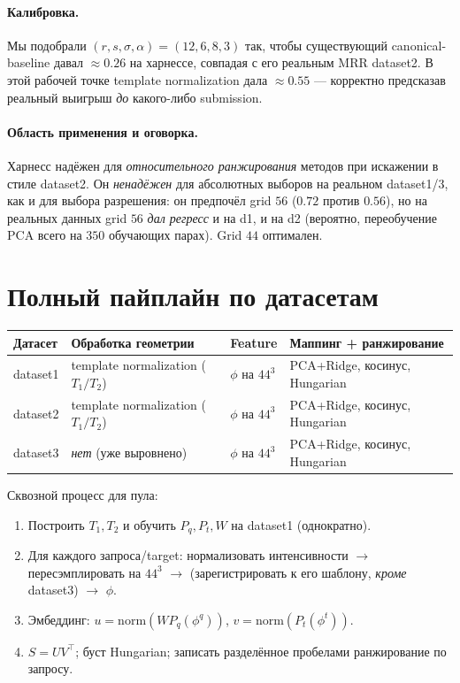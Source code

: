 \documentclass[11pt]{article}
\begin{document}
\paragraph{Калибровка.} Мы подобрали $(r,s,\sigma,\alpha)=(12,6,8,3)$ так, чтобы
существующий canonical-baseline давал $\approx0.26$ на харнессе, совпадая с его реальным
MRR dataset2. В этой рабочей точке template normalization дала $\approx0.55$
--- корректно предсказав реальный выигрыш \emph{до} какого-либо submission.

\paragraph{Область применения и оговорка.} Харнесс надёжен для \emph{относительного
ранжирования} методов при искажении в стиле dataset2. Он \emph{ненадёжен} для
абсолютных выборов на реальном dataset1/3, как и для выбора разрешения: он предпочёл
grid $56$ ($0.72$ против $0.56$), но на реальных данных grid $56$ \emph{дал регресс}
и на d1, и на d2 (вероятно, переобучение PCA всего на $350$ обучающих парах). Grid $44$
оптимален.

\section{Полный пайплайн по датасетам}

\begin{center}
\begin{tabular}{@{}llll@{}}
\toprule
Датасет & Обработка геометрии & Feature & Маппинг + ранжирование \\
\midrule
dataset1 & template normalization ($T_1/T_2$) & $\phi$ на $44^3$ & PCA+Ridge, косинус, Hungarian\\
dataset2 & template normalization ($T_1/T_2$) & $\phi$ на $44^3$ & PCA+Ridge, косинус, Hungarian\\
dataset3 & \emph{нет} (уже выровнено)       & $\phi$ на $44^3$ & PCA+Ridge, косинус, Hungarian\\
\bottomrule
\end{tabular}
\end{center}

\noindent Сквозной процесс для пула:
\begin{enumerate}[nosep]
  \item Построить $T_1,T_2$ и обучить $P_q,P_t,W$ на dataset1 (однократно).
  \item Для каждого запроса/target: нормализовать интенсивности $\to$ пересэмплировать
        на $44^3$ $\to$ (зарегистрировать к его шаблону, \emph{кроме} dataset3) $\to$ $\phi$.
  \item Эмбеддинг: $u=\mathrm{norm}(W P_q(\phi^q))$, $v=\mathrm{norm}(P_t(\phi^t))$.
  \item $S=UV^\top$; буст Hungarian; записать разделённое пробелами ранжирование по запросу.
\end{enumerate}
\end{document}
